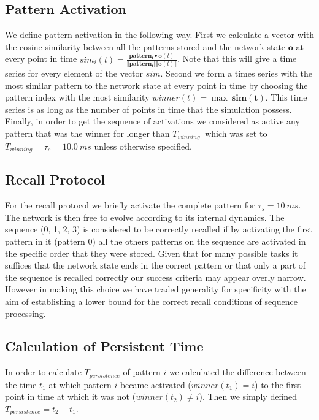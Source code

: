 \documentclass[10pt,a4paper]{article}
\begin{document}
\subsection{Pattern Activation}
We define pattern activation in the following way. First we calculate a vector with the cosine similarity between all the patterns stored and the network state $\mathbf{o}$ at every point in time $sim_i(t) = \frac{\mathbf{pattern_i} \bullet  \mathbf{o}(t)}{\Vert \mathbf{pattern_i} \Vert \Vert \mathbf{o}(t) \Vert}$. Note that this will give a time series for every element of the vector $sim$. Second we form a times series with the most similar pattern to the network state at every point in time by choosing the pattern index with the most similarity $winner(t) = \max \: \mathbf{sim(t)}$. This time series is as long as the number of points in time that the simulation possess. Finally, in order to get the sequence of activations we considered as active any pattern that was the winner for longer than  $T_{winning} \:$ which was set to $T_{winning} = \tau_s = 10.0 \: ms$ unless otherwise specified.   

\subsection{Recall Protocol}
For the recall protocol we briefly activate the complete pattern for $\tau_s = 10 \: ms$. The network is then free to evolve according to its internal dynamics. The sequence (0, 1, 2, 3) is considered to be correctly recalled if by activating the first pattern in it (pattern 0) all the others patterns on the sequence are activated in the specific order that they were stored. Given that for many possible tasks it suffices that the network state ends in the correct pattern or that only a part of the sequence is recalled correctly our success criteria may appear overly narrow. However in making this choice we have traded generality for specificity with the aim of establishing a lower bound for the correct recall conditions of sequence processing.


\subsection{Calculation of Persistent Time}
In order to calculate $T_{persistence}$ of pattern $i$ we calculated the difference between the time $t_1$ at which pattern $i$ became activated ($winner(t_1) = i$) to the first point in time at which it was not ($winner(t_2) \neq i$). Then we simply defined $T_{persistence} = t_2 - t_1$.
\end{document}
